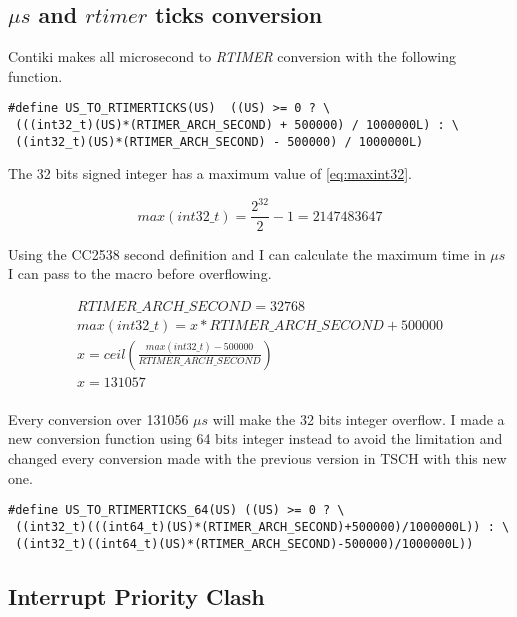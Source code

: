 \subsection{$\mu s$ and $rtimer$ ticks conversion}

Contiki makes all microsecond to \emph{RTIMER} conversion with the following
function.

\begin{lstlisting}
#define US_TO_RTIMERTICKS(US)  ((US) >= 0 ? \
 (((int32_t)(US)*(RTIMER_ARCH_SECOND) + 500000) / 1000000L) : \
 ((int32_t)(US)*(RTIMER_ARCH_SECOND) - 500000) / 1000000L)
\end{lstlisting}

The 32 bits signed integer has a maximum value of \ref{eq:maxint32}.

\begin{equation}
  \label{eq:maxint32}
  max(int32\_t) = \frac{2^{32}}{2} - 1 = 2147483647
\end{equation}

Using the CC2538 second definition and I can calculate the maximum time in $\mu s$
I can pass to the macro before overflowing.

\begin{equation}
  \label{eq:maxus}
  \begin{multlined}
  RTIMER\_ARCH\_SECOND = 32768 \\
  max(int32\_t) = x * RTIMER\_ARCH\_SECOND + 500000 \\
  x = ceil(\frac{max(int32\_t) - 500000}{RTIMER\_ARCH\_SECOND}) \\
  x = 131057 \\
  \end{multlined}
\end{equation}

Every conversion over 131056 $\mu s$ will make the 32 bits integer overflow.
I made a new conversion function using 64 bits integer instead to avoid the
limitation and changed every conversion made with the previous version in TSCH
with this new one.

\begin{lstlisting}
#define US_TO_RTIMERTICKS_64(US) ((US) >= 0 ? \
 ((int32_t)(((int64_t)(US)*(RTIMER_ARCH_SECOND)+500000)/1000000L)) : \
 ((int32_t)((int64_t)(US)*(RTIMER_ARCH_SECOND)-500000)/1000000L)) 
\end{lstlisting}

\subsection{Interrupt Priority Clash}

